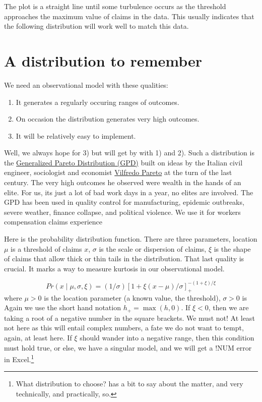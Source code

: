 \documentclass[
]{book}
\begin{document}
The plot is a straight line until some turbulence occurs as the threshold approaches the maximum value of claims in the data. This usually indicates that the following distribution will work well to match this data.

\hypertarget{a-distribution-to-remember}{%
\section{A distribution to remember}\label{a-distribution-to-remember}}

We need an observational model with these qualities:

\begin{enumerate}
\def\labelenumi{\arabic{enumi}.}
\item
  It generates a regularly occuring ranges of outcomes.
\item
  On occasion the distribution generates very high outcomes.
\item
  It will be relatively easy to implement.
\end{enumerate}

Well, we always hope for 3) but will get by with 1) and 2). Such a distribution is the \href{https://en.wikipedia.org/wiki/Generalized_Pareto_distribution}{Generalized Pareto Distribution (GPD)} built on ideas by the Italian civil engineer, sociologist and economist \href{https://en.wikipedia.org/wiki/Vilfredo_Pareto}{Vilfredo Pareto} at the turn of the last century. The very high outcomes he observed were wealth in the hands of an elite. For us, its just a lot of bad work days in a year, no elites are involved. The GPD has been used in quality control for manufacturing, epidemic outbreaks, severe weather, finance collapse, and political violence. We use it for workers compensation claims experience

Here is the probability distribution function. There are three parameters, location \(\mu\) is a threshold of claims \(x\), \(\sigma\) is the scale or dispersion of claims, \(\xi\) is the shape of claims that allow thick or thin tails in the distribution. That last quality is crucial. It marks a way to measure kurtosis in our observational model.

\[
Pr(x \mid \mu, \sigma, \xi) = (1/\sigma)[1 + \xi (x-\mu) / \sigma ]_{+}^{- (1+ \xi )/ \xi}
\]
where \(\mu>0\) is the location parameter (a known value, the threshold), \(\sigma > 0\) is Again we use the short hand notation \(h_+ = \max(h,0)\). If \(\xi<0\), then we are taking a root of a negative number in the square brackets. We must not! At least not here as this will entail complex numbers, a fate we do not want to tempt, again, at least here. If \(\xi\) should wander into a negative range, then this condition must hold true, or else, we have a singular model, and we will get a !NUM error in Excel.\footnote{What distribution to choose? \citet{Taleb2019} has a bit to say about the matter, and very technically, and practically, so.}
\end{document}
